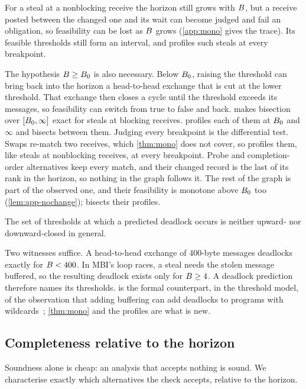 \noindent For a steal at a nonblocking receive the horizon still grows with $B$, but a receive
posted between the changed one and its wait can become judged and fail an obligation, so
feasibility can be lost as $B$ grows (\cref{app:mono} gives the trace). Its feasible
thresholds still form an interval, and \tool profiles such steals at every breakpoint.

The hypothesis $B\ge B_0$ is also necessary. Below $B_0$, raising the threshold can bring
back into the horizon a head-to-head exchange that is cut at the lower threshold. That
exchange then closes a cycle until the threshold exceeds its messages, so feasibility can
switch from true to false and back.  makes bisection over
$[B_0,\infty]$ exact for steals at blocking receives. \tool profiles each of them at
$B_0$ and $\infty$ and bisects between them. Judging every breakpoint is the
differential test. Swaps re-match two receives, which \cref{thm:mono} does not cover, so
\tool profiles them, like steals at nonblocking receives, at every breakpoint. Probe and
completion-order alternatives keep every match, and their changed record is the last of its rank
in the horizon, so nothing in the graph follows it. The rest of the graph is part of the
observed one, and their feasibility is monotone above $B_0$ too (\cref{lem:app-nochange});
\tool bisects their profiles.

\begin{proposition}
\label{prop:nonmono}
The set of thresholds at which a predicted deadlock occurs is neither upward- nor
downward-closed in general.
\end{proposition}
\noindent Two witnesses suffice. A head-to-head exchange of 400-byte messages deadlocks
exactly for $B<400$. In MBI's loop races, a steal needs the stolen message buffered,
so the resulting deadlock exists only for $B\ge 4$. A deadlock prediction therefore
names its thresholds.  is the formal counterpart, in the threshold model,
of the observation that adding buffering can add deadlocks to programs with
wildcards~\citep{vakkalanka10slack}; \cref{thm:mono} and the profiles are what is new.

\subsection{Completeness relative to the horizon}
\label{sec:complete}

Soundness alone is cheap: an analysis that accepts nothing is sound. We characterise
exactly which alternatives the check accepts, relative to the horizon.

